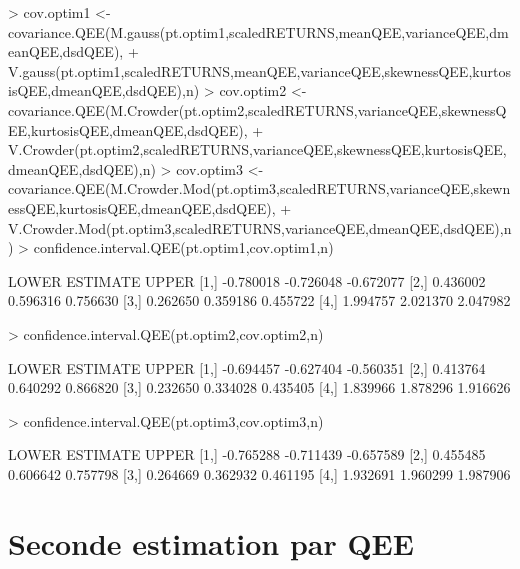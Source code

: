 \documentclass{report}
\begin{document}
\begin{Schunk}
\begin{Sinput}
> 	cov.optim1 <- covariance.QEE(M.gauss(pt.optim1,scaledRETURNS,meanQEE,varianceQEE,dmeanQEE,dsdQEE),
+ 			V.gauss(pt.optim1,scaledRETURNS,meanQEE,varianceQEE,skewnessQEE,kurtosisQEE,dmeanQEE,dsdQEE),n)
> 	cov.optim2 <- covariance.QEE(M.Crowder(pt.optim2,scaledRETURNS,varianceQEE,skewnessQEE,kurtosisQEE,dmeanQEE,dsdQEE),
+ 			V.Crowder(pt.optim2,scaledRETURNS,varianceQEE,skewnessQEE,kurtosisQEE,dmeanQEE,dsdQEE),n)
> 	cov.optim3 <- covariance.QEE(M.Crowder.Mod(pt.optim3,scaledRETURNS,varianceQEE,skewnessQEE,kurtosisQEE,dmeanQEE,dsdQEE),
+ 			V.Crowder.Mod(pt.optim3,scaledRETURNS,varianceQEE,dmeanQEE,dsdQEE),n)
> 	confidence.interval.QEE(pt.optim1,cov.optim1,n)
\end{Sinput}
\begin{Soutput}
         LOWER  ESTIMATE     UPPER
[1,] -0.780018 -0.726048 -0.672077
[2,]  0.436002  0.596316  0.756630
[3,]  0.262650  0.359186  0.455722
[4,]  1.994757  2.021370  2.047982
\end{Soutput}
\begin{Sinput}
> 	confidence.interval.QEE(pt.optim2,cov.optim2,n)
\end{Sinput}
\begin{Soutput}
         LOWER  ESTIMATE     UPPER
[1,] -0.694457 -0.627404 -0.560351
[2,]  0.413764  0.640292  0.866820
[3,]  0.232650  0.334028  0.435405
[4,]  1.839966  1.878296  1.916626
\end{Soutput}
\begin{Sinput}
> 	confidence.interval.QEE(pt.optim3,cov.optim3,n)
\end{Sinput}
\begin{Soutput}
         LOWER  ESTIMATE     UPPER
[1,] -0.765288 -0.711439 -0.657589
[2,]  0.455485  0.606642  0.757798
[3,]  0.264669  0.362932  0.461195
[4,]  1.932691  1.960299  1.987906
\end{Soutput}
\end{Schunk}

\section{Seconde estimation par QEE}

\begin{Schunk}
\end{Schunk}
\end{document}
